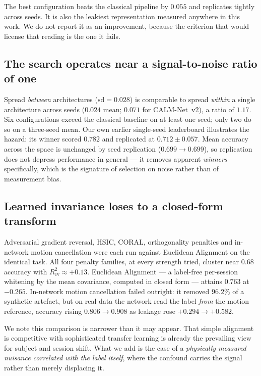 \documentclass[journal]{IEEEtran}
\begin{document}
The best configuration beats the classical pipeline by $0.055$ and replicates tightly
across seeds. It is also the leakiest representation measured anywhere in this work. We
do not report it as an improvement, because the criterion that would license that
reading is the one it fails.

\subsection{The search operates near a signal-to-noise ratio of one}

Spread \emph{between} architectures ($\mathrm{sd} = 0.028$) is comparable to spread
\emph{within} a single architecture across seeds ($0.024$ mean; $0.071$ for
CALM-Net~v2), a ratio of $1.17$. Six configurations exceed the classical baseline on at
least one seed; only two do so on a three-seed mean. Our own earlier single-seed
leaderboard illustrates the hazard: its winner scored $0.782$ and replicated at
$0.712 \pm 0.057$. Mean accuracy across the space is unchanged by seed replication
($0.699 \rightarrow 0.699$), so replication does not depress performance in general ---
it removes apparent \emph{winners} specifically, which is the signature of selection on
noise rather than of measurement bias.

\subsection{Learned invariance loses to a closed-form transform}

Adversarial gradient reversal, HSIC, CORAL, orthogonality penalties and in-network
motion cancellation were each run against Euclidean Alignment on the identical task.
All four penalty families, at every strength tried, cluster near $0.68$ accuracy with
$R^2_{\mathrm{cv}} \approx +0.13$. Euclidean Alignment --- a label-free per-session
whitening by the mean covariance, computed in closed form --- attains $0.763$ at
$-0.265$. In-network motion cancellation failed outright: it removed $96.2\%$ of a
synthetic artefact, but on real data the network read the label \emph{from} the motion
reference, accuracy rising $0.806 \rightarrow 0.908$ as leakage rose
$+0.294 \rightarrow +0.582$.

We note this comparison is narrower than it may appear. That simple alignment is
competitive with sophisticated transfer learning is already the prevailing view for
subject and session shift. What we add is the case of a \emph{physically measured
nuisance correlated with the label itself}, where the confound carries the signal
rather than merely displacing it.
\end{document}
